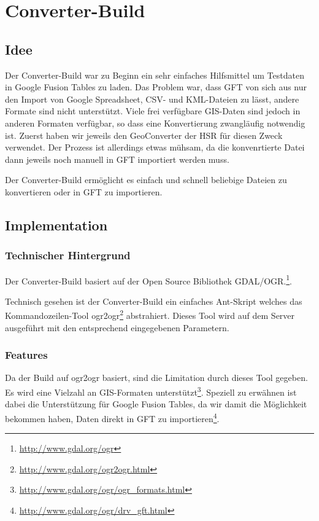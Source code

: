 \chapter{Converter-Build}
\label{converter-build}

\section{Idee}
Der Converter-Build war zu Beginn ein sehr einfaches Hilfsmittel um Testdaten in Google Fusion Tables zu laden. Das Problem war, dass GFT von sich aus nur den Import von Google Spreadsheet, \gls{CSV}- und \gls{KML}-Dateien zu lässt, andere Formate sind nicht unterstützt. Viele frei verfügbare \gls{GIS}-Daten sind jedoch in anderen Formaten verfügbar, so dass eine Konvertierung zwangläufig notwendig ist. Zuerst haben wir jeweils den GeoConverter der HSR für diesen Zweck verwendet. Der Prozess ist allerdings etwas mühsam, da die konvenrtierte Datei dann jeweils noch manuell in GFT importiert werden muss.

Der Converter-Build ermöglicht es einfach und schnell beliebige Dateien zu konvertieren oder in GFT zu importieren.

\section{Implementation}
\subsection{Technischer Hintergrund}
Der Converter-Build basiert auf der Open Source Bibliothek GDAL/OGR.\footnote{\url{http://www.gdal.org/ogr}}.

Technisch gesehen ist der Converter-Build ein einfaches Ant-Skript welches das Kommandozeilen-Tool ogr2ogr\footnote{\url{http://www.gdal.org/ogr2ogr.html}} abstrahiert. Dieses Tool wird auf dem Server ausgeführt mit den entsprechend eingegebenen Parametern. 

\subsection{Features}
Da der Build auf ogr2ogr basiert, sind die Limitation durch dieses Tool gegeben. Es wird eine Vielzahl an \gls{GIS}-Formaten unterstützt\footnote{\url{http://www.gdal.org/ogr/ogr_formats.html}}. Speziell zu erwähnen ist dabei die Unterstützung für Google Fusion Tables, da wir damit die Möglichkeit bekommen haben, Daten direkt in GFT zu importieren\footnote{\url{http://www.gdal.org/ogr/drv_gft.html}}.

